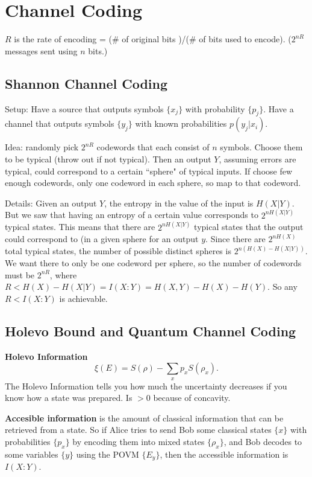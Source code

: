 \documentclass[12pt]{article}
\begin{document}
\section{Channel Coding}

$R$ is the rate of encoding = (\# of original bits )/(\# of bits used to encode). ($2^{nR}$ messages sent using $n$ bits.)

\subsection{Shannon Channel Coding}
Setup: Have a source that outputs symbols $\{x_j\}$ with probability $\{p_j\}$. Have a channel that outputs symbols $\{y_j\}$ with 
known probabilities $p(y_j|x_i)$.

Idea: randomly pick $2^{nR}$ codewords that each consist of $n$ symbols. Choose them to be typical (throw out if not typical). Then an output $Y$, assuming 
errors are typical, could correspond to a certain ``sphere" of typical inputs. If choose few enough codewords, only one codeword in each sphere, so map
to that codeword.

Details: Given an output $Y$, the entropy in the value of the input is $H(X|Y)$. But we saw that having an entropy of a certain value corresponds to $2^{nH(X|Y)}$
typical states. This means that there are $2^{nH(X|Y)}$ typical states that the output could correspond to 
(in a given sphere for an output $y$. Since there are $2^{nH(X)}$ total typical states,
the number of possible distinct spheres is $2^{n(H(X)-H(X|Y))}$. We want there to only be one codeword per sphere, so the number of codewords must
be $2^{nR}$, where $R<H(X)-H(X|Y)=I(X:Y)=H(X,Y)-H(X)-H(Y)$. So any $R<I(X:Y)$ is achievable.

\subsection{Holevo Bound and Quantum Channel Coding}
{\bf{Holevo Information}} $$\xi(E)=S(\rho)-\sum_xp_xS(\rho_x).$$
The Holevo Information tells you how much the uncertainty decreases if you know how a state was prepared. Is $>0$ 
because of concavity.

{\bf{Accesible information}} is the amount of classical information that can be retrieved from a state. So if Alice tries to send Bob some classical states $\{x\}$ with probabilities $\{p_x\}$ by encoding them into mixed states $\{\rho_x\}$, and Bob decodes to some
variables $\{y\}$ using the POVM $\{E_y\}$, then the accessible information is $I(X:Y)$. 
\end{document}
